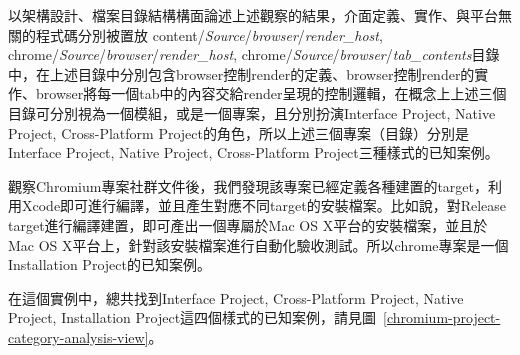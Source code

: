 \documentclass[10pt, twocolumn]{article}
\begin{document}
以架構設計、檔案目錄結構構面論述上述觀察的結果，介面定義、實作、與平台無關的程式碼分別被置放%
content\-/\textit{Source}\-/\textit{browser}\-/\textit{render\_host},%
chrome\-/\textit{Source}\-/\textit{browser}\-/\textit{render\_host},%
chrome\-/\textit{Source}\-/\textit{browser}\-/\textit{tab\_contents}\-目錄中，在上述目錄中分別包含browser控制render的定義、browser控制render的實作、browser將每一個tab中的內容交給render呈現的控制邏輯，在概念上上述三個目錄可分別視為一個模組，或是一個專案，且分別扮演Interface Project, Native Project, Cross-Platform Project的角色，所以上述三個專案（目錄）分別是Interface Project, Native Project, Cross-Platform Project三種樣式的已知案例。


觀察Chromium專案社群文件後，我們發現該專案已經定義各種建置的target，利用Xcode即可進行編譯，並且產生對應不同target的安裝檔案。比如說，對Release target進行編譯建置，即可產出一個專屬於Mac OS X平台的安裝檔案，並且於Mac OS X平台上，針對該安裝檔案進行自動化驗收測試。所以chrome專案是一個Installation Project的已知案例。

在這個實例中，總共找到Interface Project, Cross-Platform Project, Native Project, Installation Project這四個樣式的已知案例，請見圖~\ref{chromium-project-category-analysis-view}。

\end{document}
